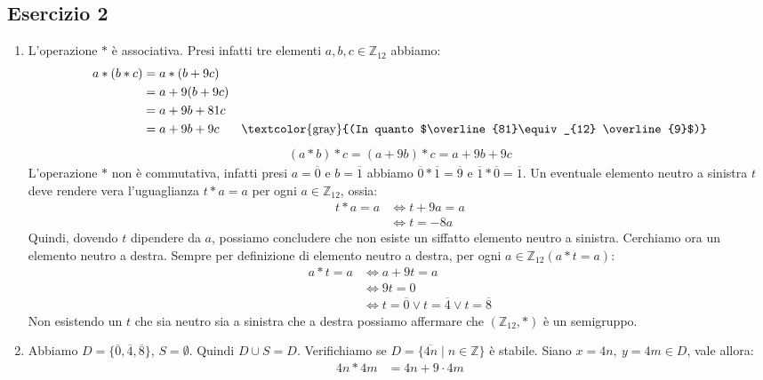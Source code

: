 \subsection*{Esercizio 2}
\begin{enumerate}[label=(\textit{\roman*})]
	\item L'operazione $\ast$ è associativa. Presi infatti tre elementi $a,b,c \in \mathbb{Z}_{12}$ abbiamo:
	\begin{align*}
		a \ast (b \ast c) &= a \ast (b+9c) \\
		&= a+ 9(b+9c) \\
		&= a+9b +81c \\
		&= a+9b+9c & \text{\textcolor{gray}{(In quanto $\overline{81}\equiv_{12} \overline{9}$)}}\\
\end{align*}
		\begin{align*}
		(a \ast b) \ast c = (a+9b) \ast c = a +9b+9c
	\end{align*}
	L'operazione $\ast$ non è commutativa, infatti presi $a=\overline{0}$ e $b=\overline{1}$ abbiamo $\overline{0} \ast \overline{1} = \overline{9}$ e $\overline{1} \ast \overline{0} = \overline{1}$. Un eventuale elemento neutro a sinistra $t$ deve rendere vera l'uguaglianza $t \ast a =  a$ per ogni $a \in \mathbb{Z}_{12}$, ossia:
	\begin{align*}
		t \ast a = a &\iff t +9a = a \\
		&\iff t =-8a
	\end{align*}
Quindi, dovendo $t$ dipendere da $a$, possiamo concludere che non esiste un siffatto elemento neutro a sinistra. Cerchiamo ora un elemento neutro a destra. Sempre per definizione di elemento neutro a destra, per ogni $a \in \mathbb{Z}_{12}(a \ast t = a)$:
\begin{align*}
	a \ast t = a &\iff a +9t = a \\
	&\iff 9t = 0 \\
	&\iff t=\overline{0} \lor t = \overline{4} \lor t = \overline{8}
\end{align*}
Non esistendo un $t$ che sia neutro sia a sinistra che a destra possiamo affermare che $(\mathbb{Z}_{12},\ast)$ è un semigruppo.
\item Abbiamo $D=\{\overline{0},\overline{4},\overline{8}\}$, $S=\emptyset$. Quindi $D \cup S = D$. Verifichiamo se $D=\{\overline{4n}\;|\; n \in \mathbb{Z}\}$ è stabile. Siano $x=4n, \ y=4m  \in D$, vale allora:
\begin{align*}
	4n \ast 4m &= 4n + 9 \cdot 4m \\

\end{align*}
\end{enumerate}
